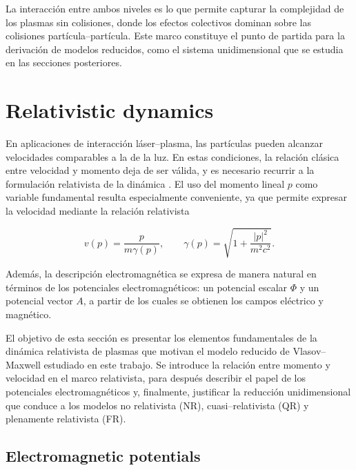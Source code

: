 \documentclass[11pt,a4paper,twoside,pdf]{article}
\numberwithin{equation}{section}
\begin{document}
La interacción entre ambos niveles es lo que permite capturar la complejidad de los
plasmas sin colisiones, donde los efectos colectivos dominan sobre las colisiones
partícula–partícula. Este marco constituye el punto de partida para la derivación de
modelos reducidos, como el sistema unidimensional que se estudia en las secciones
posteriores.




\section{Relativistic dynamics}





En aplicaciones de interacción láser–plasma, las partículas pueden alcanzar
velocidades comparables a la de la luz. En estas condiciones, la relación clásica entre
velocidad y momento deja de ser válida, y es necesario recurrir a la formulación
relativista de la dinámica \cite{janssen2022gravitacion}. El uso del momento lineal $p$ como variable fundamental
resulta especialmente conveniente, ya que permite expresar la velocidad mediante la
relación relativista


\[
v(p)=\frac{p}{m\gamma(p)}, \qquad
\gamma(p)=\sqrt{1+\frac{|p|^2}{m^2c^2}}.
\]




Además, la descripción electromagnética se expresa de manera natural en términos
de los potenciales electromagnéticos: un potencial escalar $\Phi$ y un potencial vector
$A$, a partir de los cuales se obtienen los campos eléctrico y magnético. \newline

El objetivo de esta sección es presentar los elementos fundamentales de la dinámica
relativista de plasmas que motivan el modelo reducido de Vlasov–Maxwell estudiado
en este trabajo. Se introduce la relación entre momento y velocidad
en el marco relativista, para después describir el papel de los potenciales
electromagnéticos y, finalmente, justificar la reducción unidimensional que conduce a
los modelos no relativista (NR), cuasi–relativista (QR) y plenamente relativista (FR).




\subsection{Electromagnetic potentials}
\end{document}
